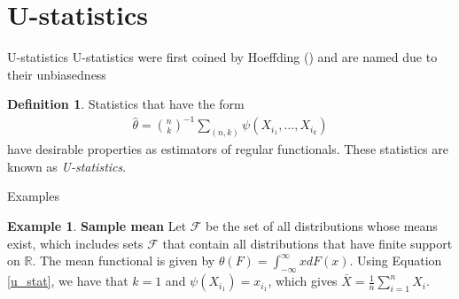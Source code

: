 \documentclass{beamer}
\newcommand{\R}{{\mathbb{R}}}
\theoremstyle{definition}
\newtheorem{Def}{Definition}
\numberwithin{Def}{section}
\newtheorem{ex}{Example}
\begin{document}
\section{U-statistics}
\begin{frame}{U-statistics}
U-statistics were first coined by Hoeffding (\cite{hoeffding1948}) and are named due to their unbiasedness
\begin{Def}
Statistics that have the form
        \begin{align}\label{u_stat}
        \hat{\theta} = {n \choose k}^{-1} \sum_{(n,k)} \psi(X_{i_1}, \dotsc, X_{i_k})
    \end{align} 
have desirable properties as estimators of regular functionals. These statistics are known as \textit{U-statistics}. 
\end{Def}
\end{frame}
\begin{frame}{Examples}
\begin{ex}\textbf{Sample mean}
Let $\mathcal{F}$ be the set of all distributions whose means exist, which includes sets $\mathcal{F}$ that contain all distributions that have finite support on $\R$. The mean functional is given by $\theta(F) = \int_{-\infty}^{\infty} x dF(x)$. Using Equation \ref{u_stat}, we have that $k=1$ and $\psi(X_{i_1}) = x_{i_1}$, which gives $\bar{X} = \frac{1}{n}\sum_{i=1}^n X_i$.
\end{ex}
\end{frame}
\end{document}
